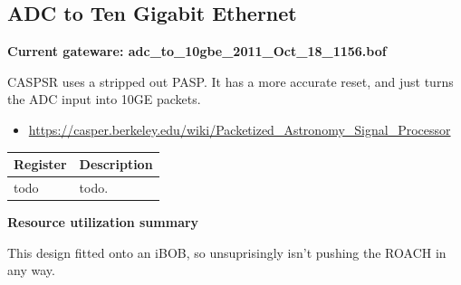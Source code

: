 \documentclass[letterpaper,10pt,english]{sphinxmanual}
\begin{document}
\subsection{ADC to Ten Gigabit Ethernet}
\label{gateware:adc-to-ten-gigabit-ethernet}
\textbf{Current gateware: adc\_to\_10gbe\_2011\_Oct\_18\_1156.bof}

CASPSR uses a stripped out PASP. It has a more accurate reset, and just turns the ADC input
into 10GE packets.
\begin{itemize}
\item {} 
\href{https://casper.berkeley.edu/wiki/Packetized\_Astronomy\_Signal\_Processor}{https://casper.berkeley.edu/wiki/Packetized\_Astronomy\_Signal\_Processor}

\end{itemize}

\begin{tabulary}{\linewidth}{|L|L|}
\hline
\textbf{
Register
} & \textbf{
Description
}\\\hline

todo
 & 
todo.
\\\hline
\end{tabulary}


\textbf{Resource utilization summary}

This design fitted onto an iBOB, so unsuprisingly isn't pushing the ROACH in any
way.
\end{document}
